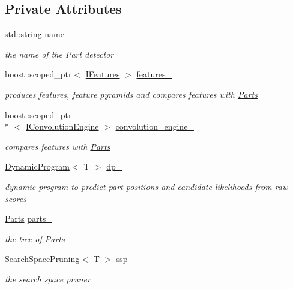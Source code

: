 \subsection*{Private Attributes}
\begin{DoxyCompactItemize}
\item 
std\-::string \hyperlink{classPartsBasedDetector_a776c766541fb4c2974c6b40a8f4f1c2f}{name\-\_\-}
\begin{DoxyCompactList}\small\item\em the name of the Part detector \end{DoxyCompactList}\item 
boost\-::scoped\-\_\-ptr$<$ \hyperlink{classIFeatures}{I\-Features} $>$ \hyperlink{classPartsBasedDetector_a6242f9b02fcb1a440cc431f2fc15521f}{features\-\_\-}
\begin{DoxyCompactList}\small\item\em produces features, feature pyramids and compares features with \hyperlink{classParts}{Parts} \end{DoxyCompactList}\item 
boost\-::scoped\-\_\-ptr\\*
$<$ \hyperlink{classIConvolutionEngine}{I\-Convolution\-Engine} $>$ \hyperlink{classPartsBasedDetector_ad06eb05d590004fe4f6940544b90b2ba}{convolution\-\_\-engine\-\_\-}
\begin{DoxyCompactList}\small\item\em compares features with \hyperlink{classParts}{Parts} \end{DoxyCompactList}\item 
\hyperlink{classDynamicProgram}{Dynamic\-Program}$<$ T $>$ \hyperlink{classPartsBasedDetector_af78da81781a7ad393e9e150f02ecd129}{dp\-\_\-}
\begin{DoxyCompactList}\small\item\em dynamic program to predict part positions and candidate likelihoods from raw scores \end{DoxyCompactList}\item 
\hyperlink{classParts}{Parts} \hyperlink{classPartsBasedDetector_ad548ec9214858535eb6a0f3783d11664}{parts\-\_\-}
\begin{DoxyCompactList}\small\item\em the tree of \hyperlink{classParts}{Parts} \end{DoxyCompactList}\item 
\hyperlink{classSearchSpacePruning}{Search\-Space\-Pruning}$<$ T $>$ \hyperlink{classPartsBasedDetector_aae91c693f9d01e3e6cbd552d7f81e474}{ssp\-\_\-}
\begin{DoxyCompactList}\small\item\em the search space pruner \end{DoxyCompactList}\end{DoxyCompactItemize}


